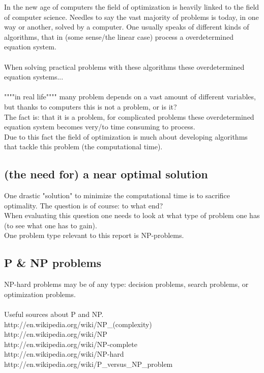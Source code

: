 
In the new age of computers the field of optimization is heavily linked to the field of computer science. Needles to say the vast majority of problems is today, in one way or another, solved by a computer. One usually speaks of different kinds of algorithms, that in (some sense/the linear case) process a overdetermined equation system.\\\\
When solving practical problems with these algorithms  these overdetermined equation systems... \\\\
""""in real life"""" many problem depends on a vast amount of different variables, but thanks to computers this is not a problem, or is it?\\
The fact is: that it is a problem, for complicated problems these overdetermined equation system becomes very/to time consuming to process. \\
\hspace{1in} Due to this fact the field of optimization is much about developing algorithms that tackle this problem (the computational time).

\subsection{(the need for) a near optimal solution}
One drastic "solution" to minimize the computational time is to sacrifice optimality. The question is of course: to what end?\\
When evaluating this question one needs to look at what type of problem one has (to see what one has to gain).\\
One problem type relevant to this report is NP-problems.

\subsection{P \& NP problems}
NP-hard problems may be of any type: decision problems, search problems, or optimization problems.\\\\
Useful sources about P and NP.\\
http://en.wikipedia.org/wiki/NP\_(complexity)\\
http://en.wikipedia.org/wiki/NP\\
http://en.wikipedia.org/wiki/NP-complete\\
http://en.wikipedia.org/wiki/NP-hard\\
http://en.wikipedia.org/wiki/P\_versus\_NP\_problem\\


